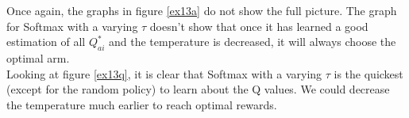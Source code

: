 \documentclass[a4paper]{article}
\begin{document}
Once again, the graphs in figure \ref{ex13a} do not show the full picture.
The graph for Softmax with a varying $\tau$ doesn't show that once it has 
learned a good estimation of all $Q^*_{ai}$ and the temperature is decreased,
it will always choose the optimal arm.\\

Looking at figure \ref{ex13q}, it is clear that Softmax with a varying $\tau$
is the quickest (except for the random policy) to learn about the Q values.
We could decrease the temperature much earlier to reach optimal rewards.

\begin{figure}[H]
	\centering
	\\

\end{figure}
\end{document}
